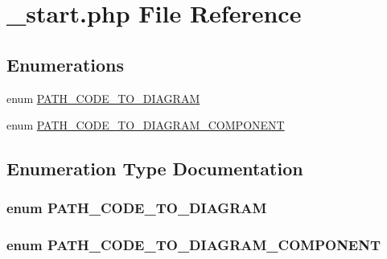 \hypertarget{__start_8php}{
\section{\_\-start.php File Reference}
\label{__start_8php}
}
\subsection*{Enumerations}
\begin{CompactItemize}
\item 
enum \hyperlink{__start_8php_bceef7ce0317a0230c7163f52877e667}{PATH\_\-CODE\_\-TO\_\-DIAGRAM} 
\item 
enum \hyperlink{__start_8php_0227eeec0798e41bef3990e74ab2cde2}{PATH\_\-CODE\_\-TO\_\-DIAGRAM\_\-COMPONENT} 
\end{CompactItemize}


\subsection{Enumeration Type Documentation}
\hypertarget{__start_8php_bceef7ce0317a0230c7163f52877e667}{
\subsubsection[{PATH\_\-CODE\_\-TO\_\-DIAGRAM}]{\setlength{\rightskip}{0pt plus 5cm}enum {\bf PATH\_\-CODE\_\-TO\_\-DIAGRAM}}}
\label{__start_8php_bceef7ce0317a0230c7163f52877e667}


\hypertarget{__start_8php_0227eeec0798e41bef3990e74ab2cde2}{
\subsubsection[{PATH\_\-CODE\_\-TO\_\-DIAGRAM\_\-COMPONENT}]{\setlength{\rightskip}{0pt plus 5cm}enum {\bf PATH\_\-CODE\_\-TO\_\-DIAGRAM\_\-COMPONENT}}}
\label{__start_8php_0227eeec0798e41bef3990e74ab2cde2}


